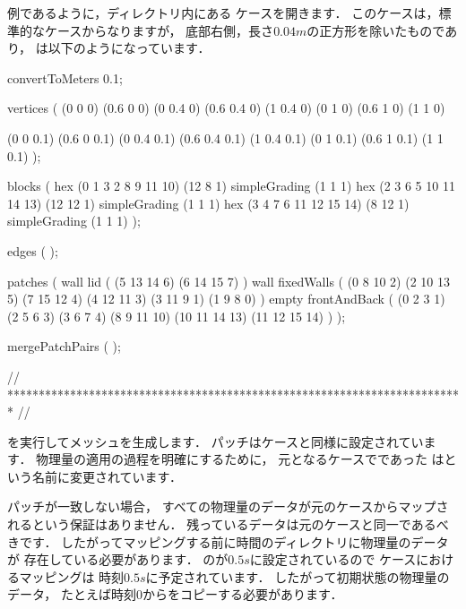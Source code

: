 例であるように，ディレクトリ内にある
ケースを開きます．
このケースは，標準的なケースからなりますが，
底部右側，長さ$0.04\unit{m}$の正方形を除いたものであり，
は以下のようになっています．
\begin{OFverbatim}[file, linenum=17]
 convertToMeters 0.1;

 vertices
 (
    (0 0 0)
    (0.6 0 0)
    (0 0.4 0)
    (0.6 0.4 0)
    (1 0.4 0)
    (0 1 0)
    (0.6 1 0)
    (1 1 0)

    (0 0 0.1)
    (0.6 0 0.1)
    (0 0.4 0.1)
    (0.6 0.4 0.1)
    (1 0.4 0.1)
    (0 1 0.1)
    (0.6 1 0.1)
    (1 1 0.1)
 );

 blocks
 (
    hex (0 1 3 2 8 9 11 10) (12 8 1) simpleGrading (1 1 1)
    hex (2 3 6 5 10 11 14 13) (12 12 1) simpleGrading (1 1 1)
    hex (3 4 7 6 11 12 15 14) (8 12 1) simpleGrading (1 1 1)
 );

 edges
 (
 );

 patches
 (
    wall lid
    (
        (5 13 14 6)
        (6 14 15 7)
    )
    wall fixedWalls
    (
        (0 8 10 2)
        (2 10 13 5)
        (7 15 12 4)
        (4 12 11 3)
        (3 11 9 1)
        (1 9 8 0)
    )
    empty frontAndBack
    (
        (0 2 3 1)
        (2 5 6 3)
        (3 6 7 4)
        (8 9 11 10)
        (10 11 14 13)
        (11 12 15 14)
    )
 );

 mergePatchPairs
 (
 );

 // ************************************************************************* //
\end{OFverbatim}
を実行してメッシュを生成します．
パッチはケースと同様に設定されています．
物理量の適用の過程を明確にするために，
元となるケースでであった
はという名前に変更されています．

パッチが一致しない場合，
すべての物理量のデータが元のケースからマップされるという保証はありません．
残っているデータは元のケースと同一であるべきです．
したがってマッピングする前に時間のディレクトリに物理量のデータが
存在している必要があります．
のが$0.5\unit{s}$に設定されているので
ケースにおけるマッピングは
時刻$0.5\unit{s}$に予定されています．
したがって初期状態の物理量のデータ，
たとえば時刻0からをコピーする必要があります．

